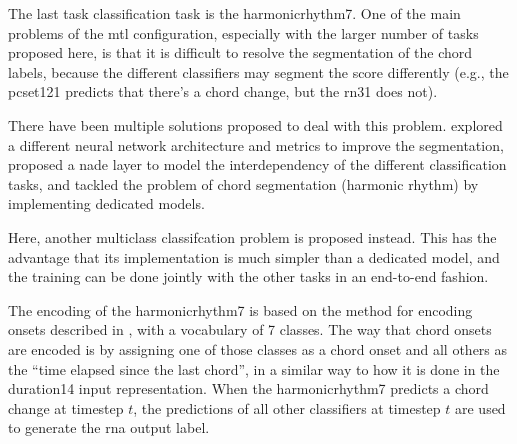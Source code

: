 
The last task classification task is the
\gls{harmonicrhythm7}. One of the main problems of the
\gls{mtl} configuration, especially with the larger number
of tasks proposed here, is that it is difficult to resolve
the segmentation of the chord labels, because the different
classifiers may segment the score differently (e.g., the
\gls{pcset121} predicts that there's a chord change, but the
\gls{rn31} does not).

There have been multiple solutions proposed to deal with
this problem. \textcite{chen2021attend} explored a different
neural network architecture and metrics to improve the
segmentation, \textcite{micchi2021deep} proposed a
\gls{nade} layer to model the interdependency of the
different classification tasks, \textcite{mcleod2021modular}
and  \textcite{wu2021melody} tackled the problem of chord
segmentation (harmonic rhythm) by implementing dedicated
models. 

Here, another multiclass classifcation problem is proposed
instead. This has the advantage that its implementation is
much simpler than a dedicated model, and the training can be
done jointly with the other tasks in an end-to-end fashion.

The encoding of the \gls{harmonicrhythm7} is based on the
method for encoding onsets described in
, with a
vocabulary of 7 classes. The way that chord onsets are
encoded is by assigning one of those classes as a chord
onset and all others as the ``time elapsed since the last
chord'', in a similar way to how it is done in the
\gls{duration14} input representation. When the
\gls{harmonicrhythm7} predicts a chord change at timestep
$t$, the predictions of all other classifiers at timestep
$t$ are used to generate the \gls{rna} output label.
